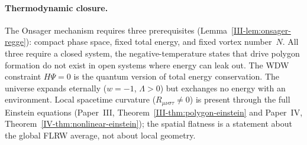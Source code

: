 \paragraph{Thermodynamic closure.}
The Onsager mechanism requires three prerequisites
(Lemma~\ref{III-lem:onsager-regge}): compact phase
space, fixed total energy, and fixed vortex number~$N$.
All three require a closed system, the negative-temperature
states that drive polygon formation do not exist in open systems
where energy can leak out.
The WDW constraint $H\Psi = 0$ is the quantum version of total
energy conservation.
The universe expands eternally ($w = -1$, $\Lambda > 0$) but
exchanges no energy with an environment.
Local spacetime curvature ($R_{\mu\nu\sigma\tau} \ne 0$) is
present through the full Einstein equations
(Paper~III, Theorem~\ref{III-thm:polygon-einstein}
and Paper~IV, Theorem~\ref{IV-thm:nonlinear-einstein});
the spatial flatness is a statement about the global FLRW
average, not about local geometry.


